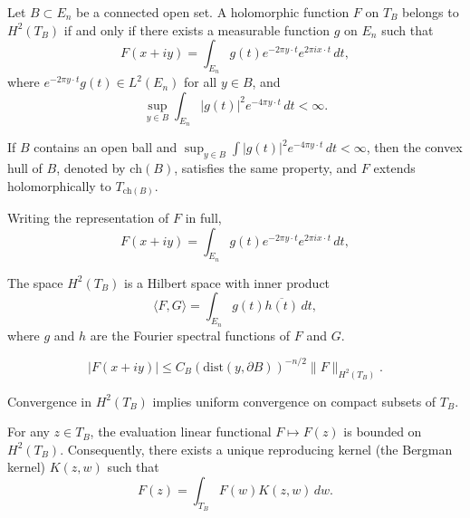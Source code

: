 \begin{theorem}\label{thm:c3-2-3}
Let $B \subset E_n$ be a connected open set. A holomorphic function $F$ on $T_B$ belongs to $H^2(T_B)$ if and only if there exists a measurable function $g$ on $E_n$ such that
\[
F(x + iy) = \int_{E_n} g(t) e^{-2\pi y \cdot t} e^{2\pi i x \cdot t}\,dt,
\]
where $e^{-2\pi y \cdot t} g(t) \in L^2(E_n)$ for all $y \in B$, and
\[
\sup_{y \in B} \int_{E_n} |g(t)|^2 e^{-4\pi y \cdot t}\,dt < \infty.
\]
\end{theorem}

\begin{corollary}\label{cor:c3-2-4}
If $B$ contains an open ball and $\sup_{y \in B} \int |g(t)|^2 e^{-4\pi y \cdot t}\,dt < \infty$, then the convex hull of $B$, denoted by $\text{ch}(B)$, satisfies the same property, and $F$ extends holomorphically to $T_{\text{ch}(B)}$.
\end{corollary}

Writing the representation of $F$ in full,
\begin{equation}\label{eq:c3-2-5}
F(x + iy) = \int_{E_n} g(t) e^{-2\pi y \cdot t} e^{2\pi i x \cdot t}\,dt,
\end{equation}

\begin{corollary}\label{cor:c3-2-6}
The space $H^2(T_B)$ is a Hilbert space with inner product
\begin{equation}\label{eq:c3-2-7}
\langle F, G \rangle = \int_{E_n} g(t) \overline{h(t)}\,dt,
\end{equation}
where $g$ and $h$ are the Fourier spectral functions of $F$ and $G$.
\end{corollary}

\begin{equation}\label{eq:c3-2-8}
|F(x + iy)| \leq C_B (\text{dist}(y, \partial B))^{-n/2} \|F\|_{H^2(T_B)}.
\end{equation}

\begin{corollary}\label{cor:c3-2-9}
Convergence in $H^2(T_B)$ implies uniform convergence on compact subsets of $T_B$.
\end{corollary}

\begin{corollary}\label{cor:c3-2-10}
For any $z \in T_B$, the evaluation linear functional $F \mapsto F(z)$ is bounded on $H^2(T_B)$. Consequently, there exists a unique reproducing kernel (the Bergman kernel) $K(z, w)$ such that
\[
F(z) = \int_{T_B} F(w) K(z, w)\,dw.
\]
\end{corollary}


